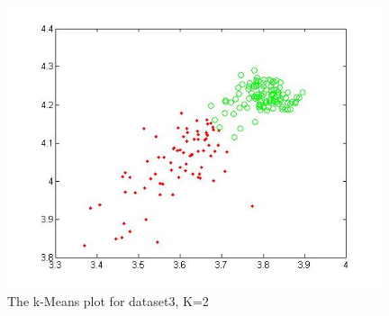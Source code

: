 \documentclass[11pt,psfig]{article}
\begin{document}
\begin{figure}[H]
\centering
\includegraphics[height=3.25in]{dataset3_kMeansPlot.jpg}
\caption{The k-Means plot for dataset3, K=2}
\end{figure}
\end{document}
